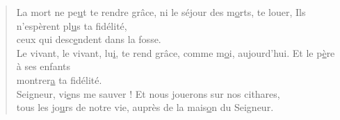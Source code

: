 \begin{verse}
La mort ne pe\underline{u}t te rendre grâce,\psalmstar
ni le séjour des m\underline{o}rts, te louer, \psalmstar
Ils n'espèrent pl\underline{u}s ta fidélité,\\
ceux qui desc\underline{e}ndent dans la fosse.\\

Le vivant, le vivant, lu\underline{i}, te rend grâce,\psalmstar
comme m\underline{o}i, aujourd'hui. \psalmstar
Et le p\underline{è}re à ses enfants\\
montrer\underline{a} ta fidélité.\\

Seigneur, vi\underline{e}ns me sauver ! \psalmdagger
Et nous jouerons sur nos cithares,\\
tous les jo\underline{u}rs de notre vie, \psalmstar
auprès de la mais\underline{o}n du Seigneur.
\end{verse}

